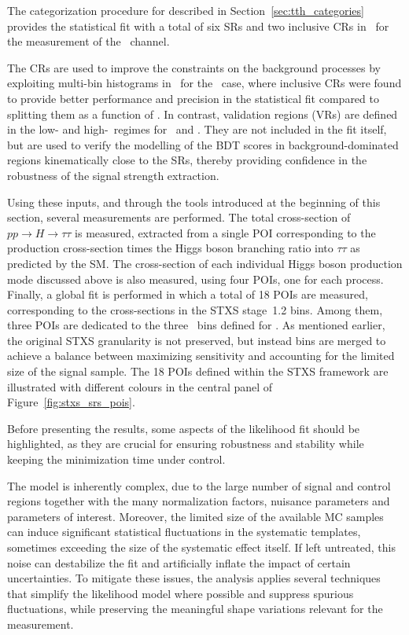 The categorization procedure for \ttH described in Section~\ref{sec:tth_categories} provides the statistical fit with a total of six SRs and two inclusive CRs in \pth\ for the measurement of the \tauhadhad\ channel. 

The CRs are used to improve the constraints on the background processes by exploiting multi-bin histograms in \mtt\ for the \ttHtt\ case, 
where inclusive CRs were found to provide better performance and precision in the statistical fit compared to splitting them as a function of \pth. 
In contrast, validation regions (VRs) are defined in the low- and high-\pt\ regimes for \ztautau\ and \ttbar. They are not included in the fit itself, but are used to verify the modelling of the BDT scores in background-dominated regions kinematically close to the SRs, thereby providing confidence in the robustness of the signal strength extraction.

Using these inputs, and through the tools introduced at the beginning of this section, several measurements are performed. 
The total cross-section of $pp \to H \to \tau\tau$ is measured, 
extracted from a single POI corresponding to the production cross-section times the Higgs boson branching ratio into $\tau\tau$ as predicted by the SM.
The cross-section of each individual Higgs boson production mode discussed above is also measured, 
using four POIs, one for each process.
Finally, a global fit is performed in which a total of 18 POIs are measured, 
corresponding to the cross-sections in the STXS stage~1.2 bins. 
Among them, three POIs are dedicated to the three \pth\ bins defined for \ttH. 
As mentioned earlier, the original STXS granularity is not preserved, but instead bins are merged to achieve a balance between maximizing sensitivity 
and accounting for the limited size of the signal sample. 
The 18 POIs defined within the STXS framework are illustrated with different colours in the central panel of Figure~\ref{fig:stxs_srs_pois}.

Before presenting the results, some aspects of the likelihood fit should be highlighted, as they are crucial for ensuring robustness and stability while keeping the minimization time under control.

The model is inherently complex, due to the large number of signal and control regions together with the many normalization factors, nuisance parameters and parameters of interest. 
Moreover, the limited size of the available MC samples can induce significant statistical fluctuations in the systematic templates, sometimes exceeding the size of the systematic effect itself. 
If left untreated, this noise can destabilize the fit and artificially inflate the impact of certain uncertainties. 
To mitigate these issues, the analysis applies several techniques that simplify the likelihood model where possible and suppress spurious fluctuations, while preserving the meaningful shape variations relevant for the measurement. 


